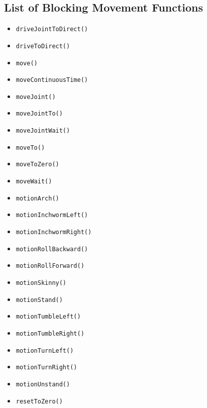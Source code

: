\documentclass{article}
\begin{document}
\subsection{List of Blocking Movement Functions}
\begin{itemize}
\item \texttt{driveJointToDirect()}
\item \texttt{driveToDirect()}
\item \texttt{move()}
\item \texttt{moveContinuousTime()}
\item \texttt{moveJoint()}
\item \texttt{moveJointTo()}
\item \texttt{moveJointWait()}
\item \texttt{moveTo()}
\item \texttt{moveToZero()}
\item \texttt{moveWait()}
\item \texttt{motionArch()}
\item \texttt{motionInchwormLeft()}
\item \texttt{motionInchwormRight()}
\item \texttt{motionRollBackward()}
\item \texttt{motionRollForward()}
\item \texttt{motionSkinny()}
\item \texttt{motionStand()}
\item \texttt{motionTumbleLeft()}
\item \texttt{motionTumbleRight()}
\item \texttt{motionTurnLeft()}
\item \texttt{motionTurnRight()}
\item \texttt{motionUnstand()}
\item \texttt{resetToZero()}
\end{itemize}
\end{document}

